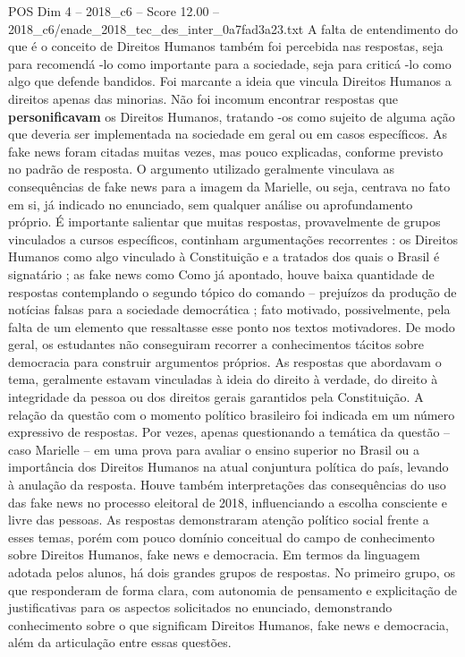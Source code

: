 \begin{textsample}{POS Dim 4 – 2018\_c6 – Score 12.00 – 2018\_c6/enade\_2018\_tec\_des\_inter\_0a7fad3a23.txt}
A falta de entendimento do que é o conceito de Direitos Humanos também foi percebida nas respostas, seja para recomendá -lo como importante para a sociedade, seja para criticá -lo como algo que defende bandidos.
Foi marcante a ideia que vincula Direitos Humanos a direitos apenas das minorias.
Não foi incomum encontrar respostas que \textbf{personificavam} os Direitos Humanos, tratando -os como sujeito de alguma ação que deveria ser implementada na sociedade em geral ou em casos específicos.
As fake news foram citadas muitas vezes, mas pouco explicadas, conforme previsto no padrão de resposta.
O argumento utilizado geralmente vinculava as consequências de fake news para a imagem da Marielle, ou seja, centrava no fato em si, já indicado no enunciado, sem qualquer análise ou aprofundamento próprio.
É importante salientar que muitas respostas, provavelmente de grupos vinculados a cursos específicos, continham argumentações recorrentes : os Direitos Humanos como algo vinculado à Constituição e a tratados dos quais o Brasil é signatário ; as fake news como Como já apontado, houve baixa quantidade de respostas contemplando o segundo tópico do comando – prejuízos da produção de notícias falsas para a sociedade democrática ; fato motivado, possivelmente, pela falta de um elemento que ressaltasse esse ponto nos textos motivadores.
De modo geral, os estudantes não conseguiram recorrer a conhecimentos tácitos sobre democracia para construir argumentos próprios.
As respostas que abordavam o tema, geralmente estavam vinculadas à ideia do direito à verdade, do direito à integridade da pessoa ou dos direitos gerais garantidos pela Constituição.
A relação da questão com o momento político brasileiro foi indicada em um número expressivo de respostas.
Por vezes, apenas questionando a temática da questão – caso Marielle – em uma prova para avaliar o ensino superior no Brasil ou a importância dos Direitos Humanos na atual conjuntura política do país, levando à anulação da resposta.
Houve também interpretações das consequências do uso das fake news no processo eleitoral de 2018, influenciando a escolha consciente e livre das pessoas.
As respostas demonstraram atenção político social frente a esses temas, porém com pouco domínio conceitual do campo de conhecimento sobre Direitos Humanos, fake news e democracia.
Em termos da linguagem adotada pelos alunos, há dois grandes grupos de respostas.
No primeiro grupo, os que responderam de forma clara, com autonomia de pensamento e explicitação de justificativas para os aspectos solicitados no enunciado, demonstrando conhecimento sobre o que significam Direitos Humanos, fake news e democracia, além da articulação entre essas questões.

\end{textsample}
